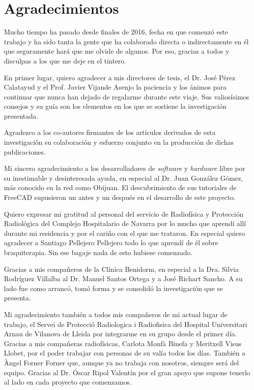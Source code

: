 \begin{flushright}
\hypertarget{Agradecimientos}{%
\chapter*{Agradecimientos}\label{agradecimientos}}


\justify
Mucho tiempo ha pasado desde finales de 2016, fecha en que comenzó este trabajo y ha sido tanta la gente que ha colaborado directa o indirectamente en él que seguramente hará que me olvide de algunos. Por eso, gracias a todos y disculpas a los que me deje en el tintero.

En primer lugar, quiero agradecer a mis directores de tesis, el Dr. José Pérez Calatayud y el Prof. Javier Vijande Asenjo la paciencia y los ánimos para continuar que nunca han dejado de regalarme durante este viaje. Sus valiosísimos consejos y su guía son los elementos en los que se sostiene la investigación presentada.         

Agradezco a los co-autores firmantes de los artículos derivados de esta investigación su colaboración y esfuerzo conjunto en la producción de dichas publicaciones.

Mi sincero agradecimiento a los desarrolladores de \textit{software} y \textit{hardware} libre por su inestimable y desinteresada ayuda, en especial al Dr. Juan González Gómez, más conocido en la red como Obijuan. El descubrimiento de sus tutoriales de FreeCAD supusieron un antes y un después en el desarrollo de este proyecto.   

Quiero expresar mi gratitud al personal del servicio de Radiofísica y Protección Radiológica del Complejo Hospitalario de Navarra por lo mucho que aprendí allí durante mi residencia y por el cariño con el que me trataron. En especial quiero agradecer a Santiago Pellejero Pellejero todo lo que aprendí de él sobre braquiterapia. Sin ese bagaje nada de esto hubiese comenzado.

Gracias a mis compañeros de la Clínica Benidorm, en especial a la Dra. Silvia Rodríguez Villalba al Dr. Manuel Santos Ortega y a José Richart Sancho. A su lado fue como arrancó, tomó forma y se consolidó la investigación que se presenta.

Mi agradecimiento también a todos mis compañeros de mi actual lugar de trabajo, el Servei de Protecció Radiologica i Radiofisica del Hospital Universitari Arnau de Vilanova de Lleida por integrarme en su grupo desde el primer día. Gracias a mis compañeras radiofísicas, Carlota Monfà Binefa y Meritxell Visus Llobet, por el poder trabajar con personas de su valía todos los días. También a Àngel Forner Forner que, aunque ya no trabaja con nosotros, siempre será del equipo. Gracias al Dr. Óscar Ripol Valentín por el gran apoyo que supone tenerlo al lado en cada proyecto que comenzamos.


\end{flushright}
